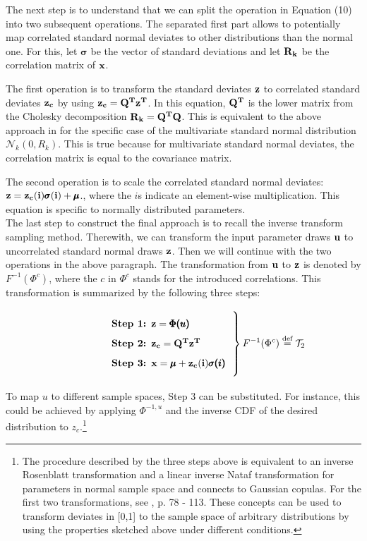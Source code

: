 \noindent
The next step is to understand that we can split the operation in Equation (10) into two subsequent operations. The separated first part allows to potentially map correlated standard normal deviates to other distributions than the normal one. For this, let $\pmb{\sigma}$ be the vector of standard deviations and let $\bold{R_k}$ be the correlation matrix of $\bold{x}$.

The first operation is to transform the standard deviates $\bold{z}$ to correlated standard deviates $\bold{z_c}$ by using $\bold{z_c}=\bold{Q^T z^T}$. In this equation, $\bold{Q^T}$ is the lower matrix from the Cholesky decomposition $\bold{R_k}=\bold{Q^T Q}$. This is equivalent to the above approach in \cite{gentle2006random} for the specific case of the multivariate standard normal distribution $\mathcal{N}_k(0, R_k)$. This is true because for multivariate standard normal deviates, the correlation matrix is equal to the covariance matrix.

The second operation is to scale the correlated standard normal deviates: $\bold{z}=\bold{z_c(i)}\pmb{\sigma}\bold{(i)} + \pmb{\mu}$., where the $i$s indicate an element-wise multiplication. This equation is specific to normally distributed parameters.\\

\noindent
The last step to construct the final approach is to recall the inverse transform sampling method. Therewith, we can transform the input parameter draws $\bold{u}$ to uncorrelated standard normal draws $\bold{z}$. Then we will continue with the two operations in the above paragraph. The transformation from $\bold{u}$ to $\bold{z}$ is denoted by $ F^{-1}(\Phi^c)$, where the $c$ in  $\Phi^c$ stands for the introduced correlations. This transformation is summarized by the following three steps:


\[
\left.\parbox{0.5\textwidth}{%
	\begin{enumerate}[label=\bfseries Step \arabic*:,leftmargin=*,labelindent=5em]
	\item $\bold{z} = \pmb{\Phi({u})}$
	\item $\bold{z_c} = \bold{Q^T z^T}$
	\item $\bold{x} = \pmb{\mu} + \bold{z_c(i)}\pmb{\sigma(i)}$
	\end{enumerate}
}\right\}F^{-1}(\Phi^c) \defeq \mathcal{T}_2
\]

\noindent
To map $u$ to different sample spaces, Step 3 can be substituted. For instance, this could be achieved by applying $\Phi^{-1,u}$ and the inverse CDF of the desired distribution to $z_c$.\footnote{The procedure described by the three steps above is equivalent to an inverse Rosenblatt transformation and a linear inverse Nataf transformation for parameters in normal sample space and connects to Gaussian copulas. For the first two transformations, see \cite{lemaire2013structural}, p. 78 - 113. These concepts can be used to transform deviates in [0,1] to the sample space of arbitrary distributions by using the properties sketched above under different conditions.}\\

